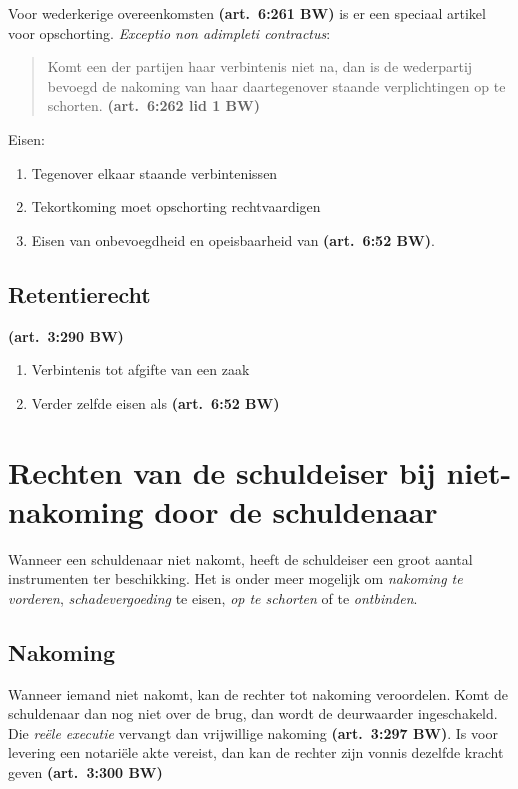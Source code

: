 \documentclass[a4paper]{article}
\newcommand{\art}[1]{\textbf{(art.~#1 BW)}\xspace}
\begin{document}
Voor wederkerige overeenkomsten \art{6:261} is er een speciaal artikel voor
opschorting. \emph{Exceptio non adimpleti contractus}:

\begin{quote}

  Komt een der partijen haar verbintenis niet na, dan is de wederpartij
  bevoegd de nakoming van haar daartegenover staande verplichtingen op te
  schorten. \art{6:262 lid 1}

\end{quote}

Eisen:
\begin{enumerate}
  \item Tegenover elkaar staande verbintenissen
  \item Tekortkoming moet opschorting rechtvaardigen
  \item Eisen van onbevoegdheid en opeisbaarheid van \art{6:52}.
\end{enumerate}

\subsection{Retentierecht}

\art{3:290}

\begin{enumerate}
  \item Verbintenis tot afgifte van een zaak
  \item Verder zelfde eisen als \art{6:52}
\end{enumerate}

\section{Rechten van de schuldeiser bij niet-nakoming door de schuldenaar}

Wanneer een schuldenaar niet nakomt, heeft de schuldeiser een groot aantal
instrumenten ter beschikking. Het is onder meer mogelijk om \emph{nakoming te
vorderen}, \emph{schadevergoeding} te eisen, \emph{op te schorten} of te
\emph{ontbinden}.

\subsection{Nakoming}

Wanneer iemand niet nakomt, kan de rechter tot nakoming veroordelen. Komt de
schuldenaar dan nog niet over de brug, dan wordt de deurwaarder ingeschakeld.
Die \emph{re\"ele executie} vervangt dan vrijwillige nakoming \art{3:297}. Is voor
levering een notari\"ele akte vereist, dan kan de rechter zijn vonnis dezelfde
kracht geven \art{3:300}
\end{document}
